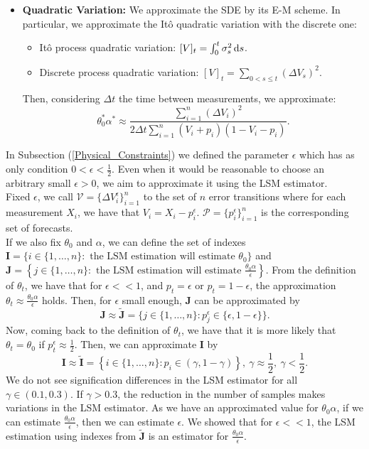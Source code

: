 \documentclass[11pt]{article}
\theoremstyle{definition}
\begin{document}
\begin{itemize}
\item \textbf{Quadratic Variation:} We approximate the SDE by its E-M scheme. In particular, we approximate the It\^o quadratic variation with the discrete one:
\begin{itemize}

\item It\^o process quadratic variation: $[V]_t=\int_0^t\sigma_s^2\dif s$.
\item Discrete process quadratic variation: $[V]_t=\sum_{0<s\leq t}(\Delta V_s)^2$.

\end{itemize}

Then, considering $\Delta t$ the time between measurements, we approximate:
\begin{equation}
\theta_0^*\alpha^*\approx\frac{\sum_{i=1}^n(\Delta V_i)^2}{2\Delta t\sum_{i=1}^n(V_i+p_i)(1-V_i-p_i)}.
\label{Eq-2}
\end{equation}

\end{itemize}

In Subsection (\ref{Physical_Constraints}) we defined the parameter $\epsilon$ which has as only condition $0<\epsilon<\frac{1}{2}$. Even when it would be reasonable to choose an arbitrary small $\epsilon>0$, we aim to approximate it using the LSM estimator.\\

Fixed $\epsilon$, we call $\mathcal{V}=\{\Delta V_i^\epsilon\}_{i=1}^n$ to the set of $n$ error transitions where for each measurement $X_i$, we have that $V_i=X_i-p_i^\epsilon$. $\mathcal{P}=\{p_i^\epsilon\}_{i=1}^n$ is the corresponding set of forecasts.\\
If we also fix $\theta_0$ and $\alpha$, we can define the set of indexes $\mathbf{I}=\{i\in\{1,\dots,n\}:\text{ the LSM estimation will estimate }\theta_0\}$ and $\mathbf{J}=\left\{j\in\{1,\dots,n\}:\text{ the LSM estimation will estimate }\frac{\theta_0\alpha}{\epsilon}\right\}$. From the definition of $\theta_t$, we have that for $\epsilon<<1$, and $p_t=\epsilon$ or $p_t=1-\epsilon$, the approximation $\theta_t\approx\frac{\theta_0\alpha}{\epsilon}$ holds. Then, for $\epsilon$ small enough, $\mathbf{J}$ can be approximated by $$\mathbf{J}\approx\tilde{\mathbf{J}}=\{j\in\{1,\dots,n\}:p_j^\epsilon\in\{\epsilon,1-\epsilon\}\}.$$
Now, coming back to the definition of $\theta_t$, we have that it is more likely that $\theta_t=\theta_0$ if $p_t^\epsilon\approx\frac{1}{2}$. Then, we can approximate $\mathbf{I}$ by $$\mathbf{I}\approx\tilde{\mathbf{I}}=\left\{i\in\{1,\dots,n\}:p_i\in(\gamma,1-\gamma)\right\},\ \gamma\approx\frac{1}{2},\ \gamma<\frac{1}{2}.$$
We do not see signification differences in the LSM estimator for all $\gamma\in(0.1,0.3)$. If $\gamma>0.3$, the reduction in the number of samples makes variations in the LSM estimator. As we have an approximated value for $\theta_0\alpha$, if we can estimate $\frac{\theta_0\alpha}{\epsilon}$, then we can estimate $\epsilon$. We showed that for $\epsilon<<1$, the LSM estimation using indexes from $\tilde{\mathbf{J}}$ is an estimator for $\frac{\theta_0\alpha}{\epsilon}$.
\end{document}
